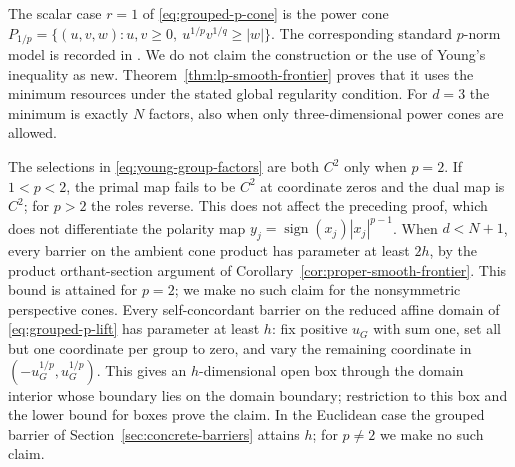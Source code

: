 The scalar case $r=1$ of \eqref{eq:grouped-p-cone} is the power cone
$P_{1/p}=\{(u,v,w):u,v\geq0,\ u^{1/p}v^{1/q}\geq|w|\}$.
The corresponding standard $p$-norm model is recorded in
\citet[Section~4.2.2]{MosekPowerCookbook}. We do not claim the
construction or the use of Young's inequality as new.
Theorem~\ref{thm:lp-smooth-frontier} proves that it uses
the minimum resources under the stated global regularity condition. For
$d=3$ the minimum is exactly $N$ factors, also when only
three-dimensional power cones are allowed.

The selections in \eqref{eq:young-group-factors} are both $C^2$
only when $p=2$. If $1<p<2$, the primal map fails to be $C^2$ at
coordinate zeros and the dual map is $C^2$; for $p>2$ the roles reverse.
This does not affect the preceding proof, which does not differentiate
the polarity map $y_j=\operatorname{sign}(x_j)|x_j|^{p-1}$.
When $d<N+1$, every barrier on the ambient cone product has
parameter at least $2h$, by the product orthant-section argument of
Corollary~\ref{cor:proper-smooth-frontier}. This bound is attained for
$p=2$; we make no such claim for the nonsymmetric perspective cones.
Every self-concordant barrier on the reduced affine domain of
\eqref{eq:grouped-p-lift} has parameter at least $h$: fix positive
$u_G$ with sum one, set all but one coordinate per group to zero, and
vary the remaining coordinate in
$(-u_G^{1/p},u_G^{1/p})$. This gives an $h$-dimensional open box through
the domain interior whose boundary lies on the domain boundary;
restriction to this box and the lower bound for boxes prove the claim.
In the Euclidean case the grouped barrier of
Section~\ref{sec:concrete-barriers} attains $h$; for $p\ne2$ we make no
such claim.


